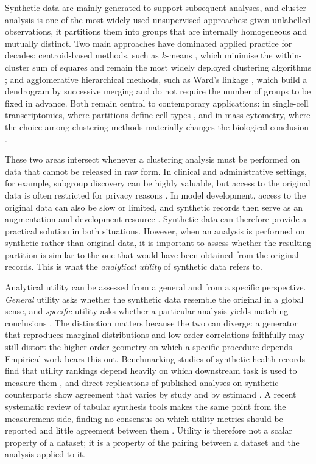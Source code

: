 \documentclass[pdflatex,referee]{sn-jnl}
\begin{document}
Synthetic data are mainly generated to support subsequent analyses, and cluster
analysis is one of the most widely used unsupervised approaches: given
unlabelled observations, it partitions them into groups that are internally
homogeneous and mutually distinct. Two main approaches have dominated applied
practice for decades: centroid-based methods, such as $k$-means
\citep{macqueen1967,steinley2006}, which minimise the within-cluster sum of
squares and remain the most widely deployed clustering algorithms
\citep{ahmed2020}; and agglomerative hierarchical methods, such as Ward's
linkage \citep{ward1963}, which build a dendrogram by successive merging and
do not require the number of groups to be fixed in advance. Both remain
central to contemporary applications: in single-cell transcriptomics, where
partitions define cell types \citep{zappia2018}, and in mass cytometry, where
the choice among clustering methods materially changes the biological
conclusion \citep{liu2019}.

These two areas intersect whenever a clustering analysis must be performed on
data that cannot be released in raw form. In clinical and administrative
settings, for example, subgroup discovery can be highly valuable, but access
to the original data is often restricted for privacy reasons
\citep{goncalves2020,elemam2020,bhanot2021}. In model development, access to
the original data can also be slow or limited, and synthetic records then
serve as an augmentation and development resource \citep{rankin2020}.
Synthetic data can therefore provide a practical solution in both situations.
However, when an analysis is performed on synthetic rather than original data,
it is important to assess whether the resulting partition is similar to the
one that would have been obtained from the original records. This is what the
\emph{analytical utility} of synthetic data refers to.

Analytical utility can be assessed from a general and from a specific
perspective. \emph{General} utility asks whether the synthetic data resemble
the original in a global sense, and \emph{specific} utility asks whether a
particular analysis yields matching conclusions \citep{snoke2018}. The
distinction matters because the two can diverge: a generator that reproduces
marginal distributions and low-order correlations faithfully may still distort
the higher-order geometry on which a specific procedure depends. Empirical work
bears this out. Benchmarking studies of synthetic health records find that
utility rankings depend heavily on which downstream task is used to measure
them \citep{yan2022,elemam2022}, and direct replications of published analyses
on synthetic counterparts show agreement that varies by study and by estimand
\citep{reinerbenaim2020}. A recent systematic review of tabular synthesis tools
makes the same point from the measurement side, finding no consensus on which
utility metrics should be reported and little agreement between them
\citep{lautrup2024}. Utility is therefore not a scalar property of a dataset;
it is a property of the pairing between a dataset and the analysis applied to
it.
\end{document}
